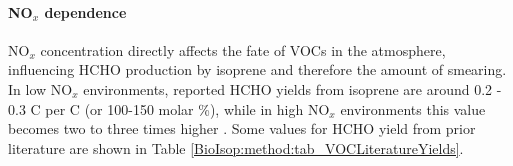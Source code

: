 \documentclass[acp, manuscript]{copernicus}
\newcommand{\parencite}{\citep}
\newcommand{\textcite}{\citet}
\begin{document}
      
      
      
      
      
      \paragraph{NO$_x$ dependence}
      
      NO$_x$ concentration directly affects the fate of VOCs in the atmosphere, influencing HCHO production by isoprene and therefore the amount of smearing.
      In low NO$_x$ environments, reported HCHO yields from isoprene are around 0.2 - 0.3 C per C (or 100-150 molar \%), while in high NO$_x$ environments this value becomes two to three times higher \parencite{Palmer2003, Wolfe2016}.
      Some values for HCHO yield from prior literature are shown in Table \ref{BioIsop:method:tab_VOCLiteratureYields}.
      
      
\end{document}

